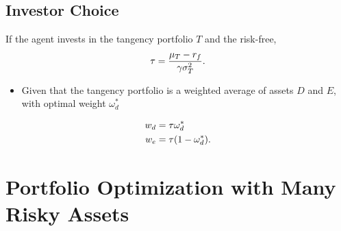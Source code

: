 \documentclass[letterpaper,10pt,english]{sphinxmanual}
\begin{document}
\subsection{Investor Choice}
\label{portfolioOpt:id9}
If the agent invests in the tangency portfolio $T$ and the
risk-free,
\begin{gather}
\begin{split}\tau = \frac{\mu_T - r_f}{\gamma  \sigma^2_T}.\end{split}\notag
\end{gather}\begin{itemize}
\item {} 
Given that the tangency portfolio is a weighted average of assets
$D$ and $E$, with optimal weight $\omega_d^*$

\end{itemize}
\begin{gather}
\begin{split}w_d & = \tau \omega_d^* \\
w_e & = \tau (1-\omega_d^*).\end{split}\notag
\end{gather}

\section{Portfolio Optimization with Many Risky Assets}
\label{multiAssetOpt:portfolio-optimization-with-many-risky-assets}\label{multiAssetOpt::doc}
\end{document}
